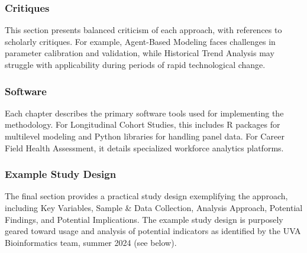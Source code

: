 \documentclass[./main.tex]{subfiles}
\begin{document}
\subsubsection{Critiques}\label{critiques}
This section presents balanced criticism of each approach, with references to scholarly critiques. For example, Agent-Based Modeling faces challenges in parameter calibration and validation, while Historical Trend Analysis may struggle with applicability during periods of rapid technological change.

\subsubsection{Software}\label{software}
Each chapter describes the primary software tools used for implementing the methodology. For Longitudinal Cohort Studies, this includes R packages for multilevel modeling and Python libraries for handling panel data. For Career Field Health Assessment, it details specialized workforce analytics platforms.

\subsubsection{Example Study Design}\label{example-study-design}
The final section provides a practical study design exemplifying the approach, including Key Variables, Sample \& Data Collection, Analysis Approach, Potential Findings, and Potential Implications. The example study design is purposely geared toward usage and analysis of potential indicators as identified by the UVA Bioinformatics team, summer 2024 (see below). 
\end{document}
